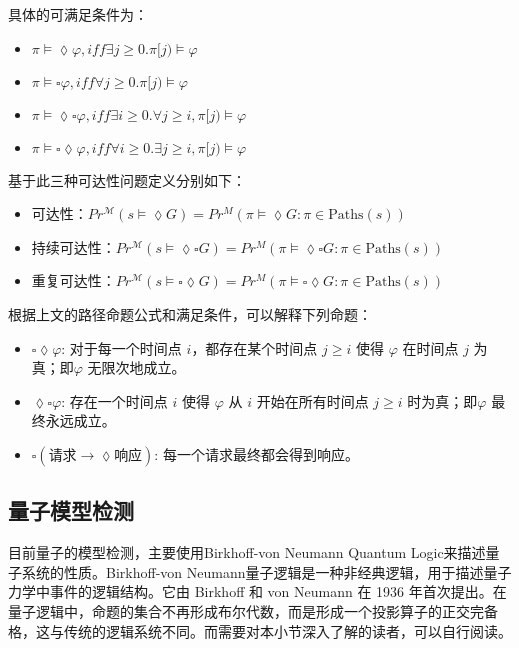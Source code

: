 具体的可满足条件为：
\begin{itemize}
    \item \(\pi\models\lozenge\varphi,iff\exists j\ge0.\pi[j)\models\varphi\)
    \item \(\pi\models\square\varphi,iff\forall j\ge 0.\pi[j)\models\varphi\)
    \item \(\pi\models\lozenge\square\varphi,iff\exists i\ge 0.\forall j\ge i,\pi[j)\models\varphi\)
    \item \(\pi\models\square\lozenge\varphi,iff\forall i\ge 0.\exists j\ge i,\pi[j)\models\varphi\)
\end{itemize}
基于此三种可达性问题定义分别如下：
\begin{itemize}
    \item 可达性：\( Pr^{\mathcal{M}}(s \models \lozenge G) = Pr^M(\pi \models \lozenge G : \pi \in \text{Paths}(s))\)
    \item 持续可达性：\( Pr^{\mathcal{M}}(s \models \lozenge \square G) = Pr^M(\pi \models \lozenge \square G : \pi \in \text{Paths}(s))\)
    \item 重复可达性：\( Pr^{\mathcal{M}}(s \models\square \lozenge G) = Pr^M(\pi \models \square\lozenge G : \pi \in \text{Paths}(s))\)
\end{itemize}
\begin{example}
    根据上文的路径命题公式和满足条件，可以解释下列命题：
    \begin{itemize}
        \item $\square\lozenge\varphi$: 对于每一个时间点 \(i\)，都存在某个时间点 \(j \geq i\) 使得 \(\varphi\) 在时间点 \(j\) 为真；即\(\varphi\) 无限次地成立。
        \item $\lozenge\square\varphi$: 存在一个时间点 \(i\) 使得 \(\varphi\) 从 \(i\) 开始在所有时间点 \(j \geq i\) 时为真；即\(\varphi\) 最终永远成立。
        \item $\square(\text{请求} \rightarrow \lozenge\text{响应})$: 每一个请求最终都会得到响应。
      \end{itemize}
\end{example}
\subsection{量子模型检测}
目前量子的模型检测，主要使用Birkhoff-von Neumann Quantum Logic来描述量子系统的性质\citep{birkhoff1987logic}。Birkhoff-von Neumann量子逻辑是一种非经典逻辑，用于描述量子力学中事件的逻辑结构。它由 Birkhoff 和 von Neumann 在 1936 年首次提出。在量子逻辑中，命题的集合不再形成布尔代数，而是形成一个投影算子的正交完备格，这与传统的逻辑系统不同。而需要对本小节深入了解的读者，可以自行阅读\citep{2021}。
